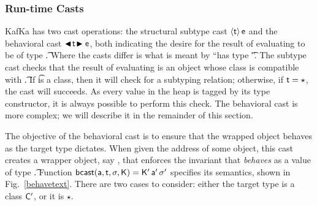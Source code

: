 \documentclass[a4paper,UKenglish]{lipics-v2018}
\newcommand{\EM}[1]{\ensuremath{#1}\xspace}
\newcommand{\xt}[1]{{\sf{#1}}}
\newcommand{\EMxt}[1]{\EM{\xt{#1}}}
\newcommand{\s}{\EM{\sigma}}
\newcommand{\K}{\EMxt K}
\newcommand{\Kp}{{\EMxt{K'}}}
\renewcommand{\sp}{{{\EM{\s'}}}}
\newcommand{\Cp}{\EMxt{C'}}
\newcommand{\any}{\EM{\star}}
\newcommand{\SubCast}[2]{\EM{\langle{#1}\rangle\,{#2}}}
\newcommand{\BehStart}{\EM{\blacktriangleleft}}
\newcommand{\BehEnd}{\EM{\blacktriangleright}}
\newcommand{\BehCast}[2]{\EM{\BehStart\! #1\! \BehEnd #2}}
\newcommand{\behcastE}[7]{\EM{\xt{bcast}(#1, #2, #3, #4) = #5\,#6\,#7}}
\newcommand{\figref}[1]{Fig.~\ref{#1}\xspace}
\newcommand{\kafka}{{\sf KafKa}\xspace}
\begin{document}
\subsubsection{Run-time Casts}

\kafka has two cast operations: the structural subtype cast $\SubCast\t\e$ and the
behavioral cast $\BehCast\t\e$, both indicating the desire for the result
of evaluating \e to be of type \t. Where the casts differ is what is meant by
``has type \t''. The subtype cast checks that the result of evaluating \e
is an object whose class is compatible with \t. If \t is a class, then it
will check for a subtyping relation; otherwise, if \EM{\t=\any}, the cast 
will succeeds. As every value in the heap is
tagged by its type constructor, it is always possible to perform this check. 
The behavioral cast is more complex; we will
describe it in the remainder of this section.

The objective of the behavioral cast is to ensure that the wrapped object
behaves as the target type dictates. When given the address \a of some
object, this cast creates a wrapper object, say \ap, that enforces the 
invariant that \a \emph{behaves} as a
value of type \t. Function \behcastE\a\t\s\K \Kp\ap\sp specifies its
semantics, shown in \figref{behavetext}. There are two cases to consider:
either the target type is a class \Cp, or it is \any.
\end{document}
